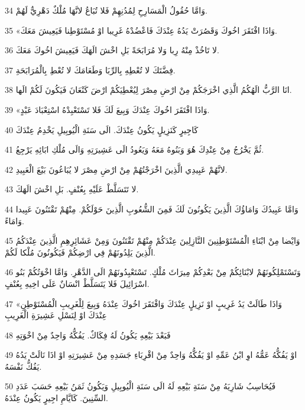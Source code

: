\par 34 وَامَّا حُقُولُ الْمَسَارِحِ لِمُدُنِهِمْ فَلا تُبَاعُ لانَّهَا مُلْكٌ دَهْرِيٌّ لَهُمْ.
\par 35 «وَاذَا افْتَقَرَ اخُوكَ وَقَصُرَتْ يَدُهُ عِنْدَكَ فَاعْضُدْهُ غَرِيبا اوْ مُسْتَوْطِنا فَيَعِيشَ مَعَكَ.
\par 36 لا تَاخُذْ مِنْهُ رِبا وَلا مُرَابَحَةً بَلِ اخْشَ الَهَكَ فَيَعِيشَ اخُوكَ مَعَكَ.
\par 37 فِضَّتَكَ لا تُعْطِهِ بِالرِّبَا وَطَعَامَكَ لا تُعْطِ بِالْمُرَابَحَةِ.
\par 38 انَا الرَّبُّ الَهُكُمُ الَّذِي اخْرَجَكُمْ مِنْ ارْضِ مِصْرَ لِيُعْطِيَكُمْ ارْضَ كَنْعَانَ فَيَكُونَ لَكُمْ الَها.
\par 39 «وَاذَا افْتَقَرَ اخُوكَ عِنْدَكَ وَبِيعَ لَكَ فَلا تَسْتَعْبِدْهُ اسْتِعْبَادَ عَبْدٍ.
\par 40 كَاجِيرٍ كَنَزِيلٍ يَكُونُ عِنْدَكَ. الَى سَنَةِ الْيُوبِيلِ يَخْدِمُ عِنْدَكَ
\par 41 ثُمَّ يَخْرُجُ مِنْ عِنْدِكَ هُوَ وَبَنُوهُ مَعَهُ وَيَعُودُ الَى عَشِيرَتِهِ وَالَى مُلْكِ ابَائِهِ يَرْجِعُ.
\par 42 لانَّهُمْ عَبِيدِي الَّذِينَ اخْرَجْتُهُمْ مِنْ ارْضِ مِصْرَ لا يُبَاعُونَ بَيْعَ الْعَبِيدِ.
\par 43 لا تَتَسَلَّطْ عَلَيْهِ بِعُنْفٍ. بَلِ اخْشَ الَهَكَ.
\par 44 وَامَّا عَبِيدُكَ وَامَاؤُكَ الَّذِينَ يَكُونُونَ لَكَ فَمِنَ الشُّعُوبِ الَّذِينَ حَوْلَكُمْ. مِنْهُمْ تَقْتَنُونَ عَبِيدا وَامَاءً.
\par 45 وَايْضا مِنْ ابْنَاءِ الْمُسْتَوْطِنِينَ النَّازِلِينَ عِنْدَكُمْ مِنْهُمْ تَقْتَنُونَ وَمِنْ عَشَائِرِهِمِ الَّذِينَ عِنْدَكُمُ الَّذِينَ يَلِدُونَهُمْ فِي ارْضِكُمْ فَيَكُونُونَ مُلْكا لَكُمْ.
\par 46 وَتَسْتَمْلِكُونَهُمْ لابْنَائِكُمْ مِنْ بَعْدِكُمْ مِيرَاثَ مُلْكٍ. تَسْتَعْبِدُونَهُمْ الَى الدَّهْرِ. وَامَّا اخْوَتُكُمْ بَنُو اسْرَائِيلَ فَلا يَتَسَلَّطْ انْسَانٌ عَلَى اخِيهِ بِعُنْفٍ.
\par 47 «وَاذَا طَالَتْ يَدُ غَرِيبٍ اوْ نَزِيلٍ عِنْدَكَ وَافْتَقَرَ اخُوكَ عِنْدَهُ وَبِيعَ لِلْغَرِيبِ الْمُسْتَوْطِنِ عِنْدَكَ اوْ لِنَسْلِ عَشِيرَةِ الْغَرِيبِ
\par 48 فَبَعْدَ بَيْعِهِ يَكُونُ لَهُ فِكَاكٌ. يَفُكُّهُ وَاحِدٌ مِنْ اخْوَتِهِ
\par 49 اوْ يَفُكُّهُ عَمُّهُ اوِ ابْنُ عَمِّهِ اوْ يَفُكُّهُ وَاحِدٌ مِنْ اقْرِبَاءِ جَسَدِهِ مِنْ عَشِيرَتِهِ اوْ اذَا نَالَتْ يَدُهُ يَفُكُّ نَفْسَهُ.
\par 50 فَيُحَاسِبُ شَارِيَهُ مِنْ سَنَةِ بَيْعِهِ لَهُ الَى سَنَةِ الْيُوبِيلِ وَيَكُونُ ثَمَنُ بَيْعِهِ حَسَبَ عَدَدِ السِّنِينَ. كَايَّامِ اجِيرٍ يَكُونُ عِنْدَهُ.

